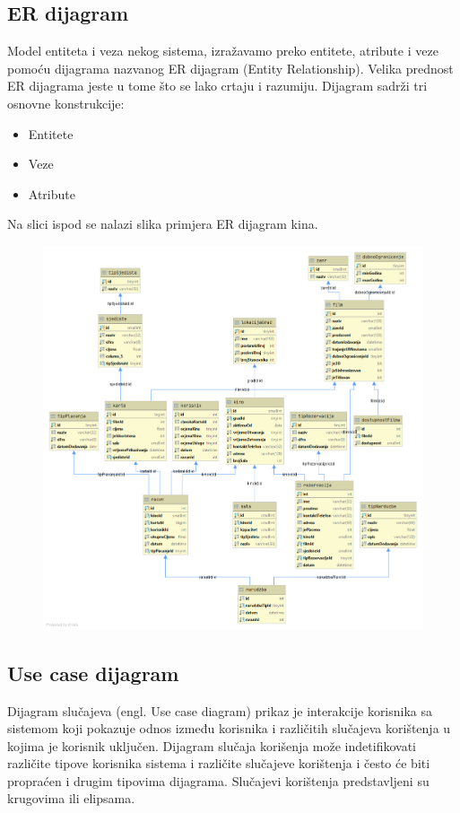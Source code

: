 \documentclass[12pt,table,xcdraw]{article}
\begin{document}
\subsection{ER dijagram}

Model entiteta i veza nekog sistema, izražavamo preko entitete, atribute i veze pomoću dijagrama nazvanog ER dijagram
(Entity Relationship).
Velika prednost ER dijagrama jeste u tome što se lako crtaju i razumiju.
Dijagram sadrži tri osnovne konstrukcije:
\begin{itemize}
\item Entitete
\item Veze
\item Atribute
\end{itemize}


Na slici ispod se nalazi slika primjera ER dijagram kina. 

\newpage

\begin{figure}[h]
\centering
\captionsetup{justification=centering}
\includegraphics[width=0.85\columnwidth]{slike/slika1.png}
\label{fig:kod}
\end{figure}

\newpage

\subsection{Use case dijagram}

Dijagram slučajeva (engl. Use case diagram) prikaz je interakcije korisnika sa sistemom koji pokazuje odnos između korisnika i različitih slučajeva korištenja u kojima je korisnik uključen. Dijagram slučaja korišenja može indetifikovati različite tipove korisnika sistema i različite slučajeve korištenja i često će biti propraćen i drugim tipovima dijagrama. Slučajevi korištenja predstavljeni su krugovima ili elipsama.
\end{document}
